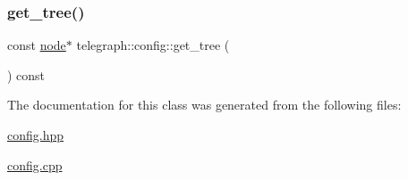 \mbox{\label{classtelegraph_1_1config_a037e49fa107a7d738747caa7212388ad}} 
\subsubsection{\texorpdfstring{get\+\_\+tree()}{get\_tree()}}
{\footnotesize\ttfamily const \hyperlink{classtelegraph_1_1node}{node}$\ast$ telegraph\+::config\+::get\+\_\+tree (\begin{DoxyParamCaption}{ }\end{DoxyParamCaption}) const\hspace{0.3cm}{\ttfamily [inline]}}



The documentation for this class was generated from the following files\+:\begin{DoxyCompactItemize}
\item 
\hyperlink{config_8hpp}{config.\+hpp}\item 
\hyperlink{config_8cpp}{config.\+cpp}\end{DoxyCompactItemize}
